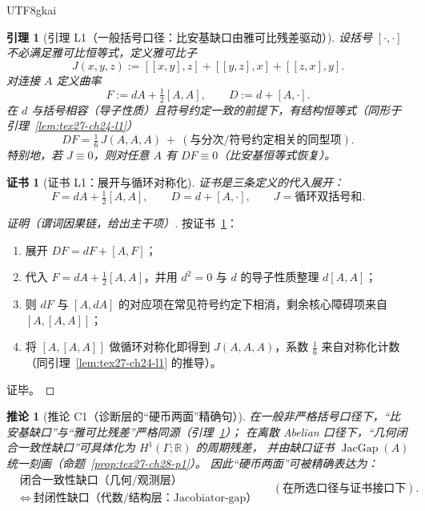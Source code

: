 \documentclass[12pt]{article}
\newtheorem{corollary}{推论}[section]
\newtheorem{lemma}{引理}[section]
\newtheorem{Certificate}{证书}[section]
\newcommand{\RR}{\mathbb{R}}
\newcommand{\JacGap}{\operatorname{JacGap}}
\begin{document}
\begin{CJK*}{UTF8}{gkai}
\begin{lemma}[引理 L1（一般括号口径：比安基缺口由雅可比残差驱动）]
\label{lem:tex27-ch28-l1}
设括号 $[\cdot,\cdot]$ 不必满足雅可比恒等式，定义雅可比子
\[
  J(x,y,z):=[[x,y],z]+[[y,z],x]+[[z,x],y].
\]
对连接 $A$ 定义曲率
\[
  F:=dA+\tfrac12[A,A],
  \qquad
  D:=d+[A,\cdot].
\]
在 $d$ 与括号相容（导子性质）且符号约定一致的前提下，有结构恒等式（同形于引理~\ref{lem:tex27-ch24-l1}）
\[
  DF=\tfrac16\,J(A,A,A)\ +\ (\text{与分次/符号约定相关的同型项}).
\]
特别地，若 $J\equiv 0$，则对任意 $A$ 有 $DF\equiv 0$（比安基恒等式恢复）。
\end{lemma}

\begin{Certificate}[证书 L1：展开与循环对称化]
\label{cert:tex27-ch28-l1}
证书是三条定义的代入展开：
\[
  F=dA+\tfrac12[A,A],
  \qquad
  D=d+[A,\cdot],
  \qquad
  J=\text{循环双括号和}.
\]
\end{Certificate}

\begin{proof}[证明（谓词因果链，给出主干项）]
按证书~\ref{cert:tex27-ch28-l1}：
\begin{enumerate}
  \item 展开 $DF=dF+[A,F]$；
  \item 代入 $F=dA+\tfrac12[A,A]$，并用 $d^2=0$ 与 $d$ 的导子性质整理 $d[A,A]$；
  \item 则 $dF$ 与 $[A,dA]$ 的对应项在常见符号约定下相消，剩余核心障碍项来自 $[A,[A,A]]$；
  \item 将 $[A,[A,A]]$ 做循环对称化即得到 $J(A,A,A)$，系数 $\tfrac16$ 来自对称化计数（同引理~\ref{lem:tex27-ch24-l1} 的推导）。
\end{enumerate}
证毕。
\end{proof}

\begin{corollary}[推论 C1（诊断层的“硬币两面”精确句）]
\label{cor:tex27-ch28-c1}
在一般非严格括号口径下，“比安基缺口”与“雅可比残差”严格同源（引理~\ref{lem:tex27-ch28-l1}）；
在离散 Abelian 口径下，“几何闭合一致性缺口”可具体化为 $H^1(\Gamma;\RR)$ 的周期残差，
并由缺口证书 $\JacGap(A)$ 统一刻画（命题~\ref{prop:tex27-ch28-p1}）。
因此“硬币两面”可被精确表达为：
\[
  \boxed{
  \begin{aligned}
    &\text{闭合一致性缺口（几何/观测层）}\\
    &\Longleftrightarrow\ \text{封闭性缺口（代数/结构层：Jacobiator-gap）}
  \end{aligned}
  }
  \quad(\text{在所选口径与证书接口下}).
\]
\end{corollary}


\end{CJK*}
\end{document}
